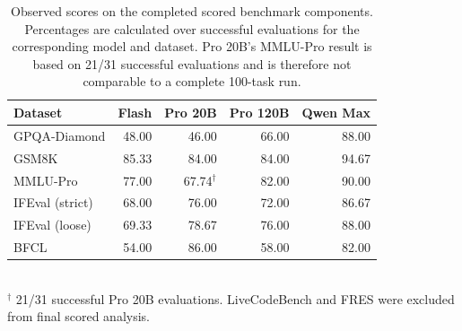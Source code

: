 \begin{table}[t]
\centering
\caption{Observed scores on the completed scored benchmark components. Percentages are calculated over successful evaluations for the corresponding model and dataset. Pro 20B's MMLU-Pro result is based on 21/31 successful evaluations and is therefore not comparable to a complete 100-task run.}
\label{tab:results}
\begin{tabular}{lrrrr}
\toprule
Dataset & Flash & Pro 20B & Pro 120B & Qwen Max \\
\midrule
GPQA-Diamond & 48.00 & 46.00 & 66.00 & 88.00 \\
GSM8K & 85.33 & 84.00 & 84.00 & 94.67 \\
MMLU-Pro & 77.00 & 67.74$^{\dagger}$ & 82.00 & 90.00 \\
IFEval (strict) & 68.00 & 76.00 & 72.00 & 86.67 \\
IFEval (loose) & 69.33 & 78.67 & 76.00 & 88.00 \\
BFCL & 54.00 & 86.00 & 58.00 & 82.00 \\
\bottomrule
\end{tabular}
\\[-2pt]
{\footnotesize $^{\dagger}$ 21/31 successful Pro 20B evaluations. LiveCodeBench and FRES were excluded from final scored analysis.}
\end{table}
